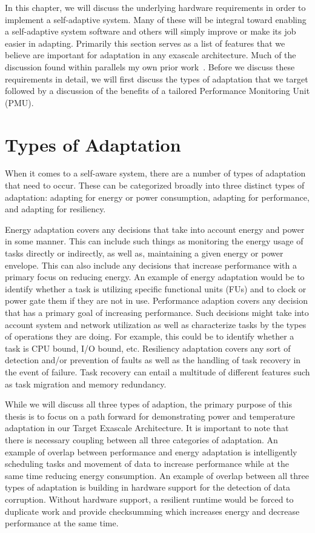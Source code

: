\label{chap:requirements}
In this chapter, we will discuss the underlying hardware requirements in order to implement a self-adaptive system. Many of these will be integral toward enabling a self-adaptive system software and others will simply improve or make its job easier in adapting. Primarily this section serves as a list of features that we believe are important for adaptation in any exascale architecture. Much of the discussion found within parallels my own prior work~\cite{Landwehr2014}. Before we discuss these requirements in detail, we will first discuss the types of adaptation that we target followed by a discussion of the benefits of a tailored Performance Monitoring Unit (PMU).

\section{Types of Adaptation}
    When it comes to a self-aware system, there are a number of types of adaptation that need to occur. These can be categorized broadly into three distinct types of adaptation: adapting for energy or power consumption, adapting for performance, and adapting for resiliency.

    Energy adaptation covers any decisions that take into account energy and power in some manner. This can include such things as monitoring the energy usage of tasks directly or indirectly, as well as, maintaining a given energy or power envelope. This can also include any decisions that increase performance with a primary focus on reducing energy. An example of energy adaptation would be to identify whether a task is utilizing specific functional units (FUs) and to clock or power gate them if they are not in use. Performance adaption covers any decision that has a primary goal of increasing performance. Such decisions might take into account system and network utilization as well as characterize tasks by the types of operations they are doing. For example, this could be to identify whether a task is CPU bound, I/O bound, etc. Resiliency adaptation covers any sort of detection and/or prevention of faults as well as the handling of task recovery in the event of failure. Task recovery can entail a multitude of different features such as task migration and memory redundancy.

    While we will discuss all three types of adaption, the primary purpose of this thesis is to focus on a path forward for demonstrating power and temperature adaptation in our Target Exascale Architecture. It is important to note that there is necessary coupling between all three categories of adaptation. An example of overlap between performance and energy adaptation is intelligently scheduling tasks and movement of data to increase performance while at the same time reducing energy consumption. An example of overlap between all three types of adaptation is building in hardware support for the detection of data corruption. Without hardware support, a resilient runtime would be forced to duplicate work and provide checksumming which increases energy and decrease performance at the same time.

